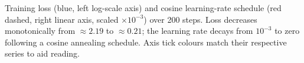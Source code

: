 \caption{Training loss (blue, left log-scale axis) and cosine learning-rate schedule (red dashed, right linear axis, scaled $\times10^{-3}$) over 200 steps. Loss decreases monotonically from ${\approx}2.19$ to ${\approx}0.21$; the learning rate decays from $10^{-3}$ to zero following a cosine annealing schedule. Axis tick colours match their respective series to aid reading.}
